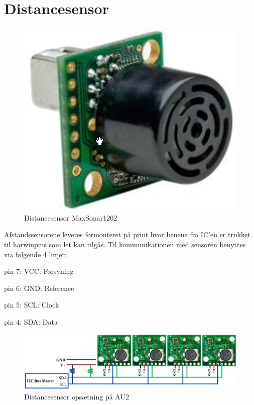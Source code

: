 \section{Distancesensor} \label{sec:hw_design_distancesensor}

\begin{figure}[ht]
	\centering
	\includegraphics[scale=0.4]{../fig/billeder/distancesensor.png}
	\caption{Distancesensor MaxSonar1202}
	\label{fig:ds_pic}
\end{figure}

\newpage
Afstandssensorene leveres formonteret på print hvor benene fra IC'en er trukket til harwinpins som let kan tilgås. Til kommunikationen med sensoren benyttes \IIC via følgende 4 linjer: 

\begin{packed_item}
	\item pin 7: VCC: Forsyning
	\item pin 6: GND: Reference
	\item pin 5: SCL: Clock
	\item pin 4: SDA: Data
\end{packed_item}

\begin{figure}[ht]
	\centering
	\includegraphics[scale=0.45]{../fig/billeder/distancesensor_multi.png}
	\caption{Distancesensor opsætning på AU2}
	\label{fig:ds_multi}
\end{figure}


